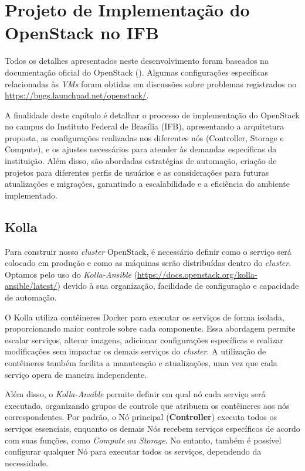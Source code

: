 \chapter{Projeto de Implementação do OpenStack no IFB}
\label{ref:implementation_project_openstack_ifb}

Todos os detalhes apresentados neste desenvolvimento foram baseados na documentação oficial do OpenStack (\cite{DocumentacaoOpenstack}). Algumas configurações específicas relacionadas às \textit{VMs} foram obtidas em discussões sobre problemas registrados no \url{https://bugs.launchpad.net/openstack/}.

A finalidade deste capítulo é detalhar o processo de implementação do OpenStack no campus do Instituto Federal de Brasília (IFB), apresentando a arquitetura proposta, as configurações realizadas nos diferentes nós (Controller, Storage e Compute), e os ajustes necessários para atender às demandas específicas da instituição. Além disso, são abordadas estratégias de automação, criação de projetos para diferentes perfis de usuários e as considerações para futuras atualizações e migrações, garantindo a escalabilidade e a eficiência do ambiente implementado.


\section{Kolla}
Para construir nosso \textit{cluster} OpenStack, é necessário definir como o serviço será colocado em produção e como as máquinas serão distribuídas dentro do \textit{cluster}. Optamos pelo uso do \textit{Kolla-Ansible} (\url{https://docs.openstack.org/kolla-ansible/latest/}) devido à sua organização, facilidade de configuração e capacidade de automação.

O Kolla utiliza contêineres Docker para executar os serviços de forma isolada, proporcionando maior controle sobre cada componente. Essa abordagem permite escalar serviços, alterar imagens, adicionar configurações específicas e realizar modificações sem impactar os demais serviços do \textit{cluster}. A utilização de contêineres também facilita a manutenção e atualizações, uma vez que cada serviço opera de maneira independente.

Além disso, o \textit{Kolla-Ansible} permite definir em qual nó cada serviço será executado, organizando grupos de controle que atribuem os contêineres aos nós correspondentes. Por padrão, o Nó principal (\textbf{Controller}) executa todos os serviços essenciais, enquanto os demais Nós recebem serviços específicos de acordo com suas funções, como \textit{Compute} ou \textit{Storage}. No entanto, também é possível configurar qualquer Nó para executar todos os serviços, dependendo da necessidade.

